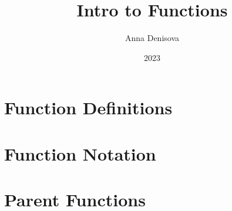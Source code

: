 \documentclass{article}
\title{Intro to Functions}
\author{Anna Denisova}
\date{2023}
\begin{document}
\maketitle
\tableofcontents


\newpage
\section{Function Definitions}


\newpage
\section{Function Notation}


\newpage
\section{Parent Functions}
\end{document}
